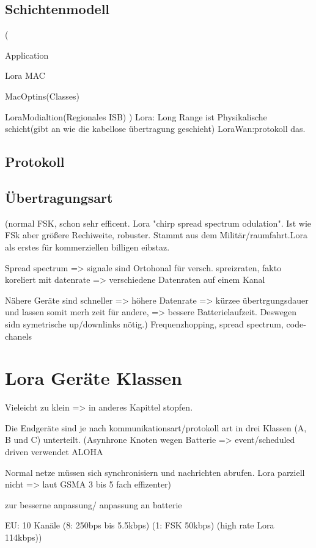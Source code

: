 \documentclass[a4paper,12pt]{article}
\begin{document}
    \subsection{Schichtenmodell}

    \cite{WhatIsLoRa}(

    Application

    Lora MAC

    MacOptins(Classes)

    LoraModialtion(Regionales ISB)
    )
    Lora: Long Range ist Physikalische schicht(gibt an wie die kabellose übertragung geschieht)
    LoraWan:protokoll das.
    \subsection{Protokoll}
    \subsection{Übertragungsart}
    \cite{WhatIsLoRa}(normal FSK, schon sehr efficent. Lora "chirp spread spectrum odulation". Ist wie FSk aber größere Rechiweite, robuster. Stammt aus dem Militär/raumfahrt.Lora als erstes für kommerziellen billigen eibstaz.
    
    Spread spectrum => signale sind Ortohonal für versch. spreizraten, fakto koreliert mit datenrate => verschiedene Datenraten auf einem Kanal
    
    Nähere Geräte sind schneller => höhere Datenrate => kürzee übertrgungsdauer und lassen somit merh zeit für andere, => bessere Batterielaufzeit. Deswegen sidn symetrische up/downlinks nötig.)
    Frequenzhopping, spread spectrum, code-chanels
    \section{Lora Geräte Klassen}
    Vieleicht zu klein => in anderes Kapittel stopfen.

    Die Endgeräte sind je nach kommunikationsart/protokoll art in drei Klassen (A, B und C) unterteilt. 
        \cite{RFC8376}
        \cite{LoraClasses}
        \cite{WhatIsLoRa}(Asynhrone Knoten wegen Batterie => event/scheduled driven verwendet ALOHA
        
        Normal netze müssen sich synchronisiern und nachrichten abrufen. Lora parziell nicht => laut GSMA 3 bis 5 fach effizenter)
    
        zur besserne anpassung/ anpassung an batterie
        
        EU: 10 Kanäle (8: 250bps bis 5.5kbps) (1: FSK 50kbps) (high rate Lora 114kbps))
\end{document}
